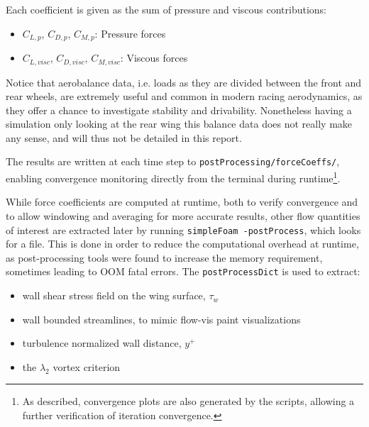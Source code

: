\documentclass[12pt,a4paper]{article}
\begin{document}
Each coefficient is given as the sum of pressure and viscous contributions:

\begin{itemize}
    \item $C_{L,p}$, $C_{D,p}$, $C_{M,p}$: Pressure forces
    \item $C_{L,visc}$, $C_{D,visc}$, $C_{M,visc}$: Viscous forces
\end{itemize}

Notice that aerobalance data, i.e. loads as they are divided between the front and rear wheels, are extremely useful and common in modern racing aerodynamics, as they offer a chance to investigate stability and drivability. Nonetheless having a simulation only looking at the rear wing this balance data does not really make any sense, and will thus not be detailed in this report.

The results are written at each time step to \texttt{postProcessing/forceCoeffs/}, enabling convergence monitoring directly from the terminal during runtime\footnote{As described, convergence plots are also generated by the scripts, allowing a further verification of iteration convergence.}.

While force coefficients are computed at runtime, both to verify convergence and to allow windowing and averaging for more accurate results, other flow quantities of interest are extracted later by running \texttt{simpleFoam -postProcess}, which looks for a  file. This is done in order to reduce the computational overhead at runtime, as post-processing tools were found to increase the memory requirement, sometimes leading to OOM fatal errors. The \texttt{postProcessDict} is used to extract:

\begin{itemize}
    \item wall shear stress field on the wing surface, $\tau_w$
    \item wall bounded streamlines, to mimic flow-vis paint visualizations
    \item turbulence normalized wall distance, $y^+$
    \item the $\lambda_2$ vortex criterion
\end{itemize}
\end{document}

